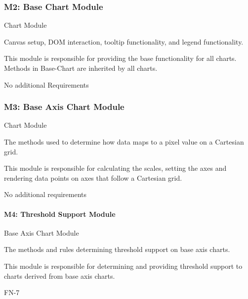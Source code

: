 \documentclass[12pt, titlepage]{article}
\begin{document}
\subsubsection{M2: Base Chart Module}
\begin{description}[style=nextline]
\item[Type:] Chart Module
\item[Secrets:] Canvas setup, DOM interaction, tooltip functionality, and legend functionality. %
\item[Responsibilities:] This module is responsible for providing the base functionality for all charts. Methods in Base-Chart are inherited by all charts.
\item[Requirements:] No additional Requirements
\end{description}


\subsubsection{M3: Base Axis Chart Module}
\begin{description}[style=nextline]
\item[Type:] Chart Module
\item[Secrets:] The methods used to determine how data maps to a pixel value on a Cartesian grid. 
\item[Responsibilities:] This module is responsible for calculating the scales, setting the axes and rendering data points on axes that follow a Cartesian grid. 
\item[Requirements:] No additional requirements
\end{description}

\paragraph{M4: Threshold Support Module}
\begin{description}[style=nextline]
\item[Type:] Base Axis Chart Module
\item[Secrets:] The methods and rules determining threshold support on base axis charts. 
\item[Responsibilities:]  This module is responsible for determining and providing threshold support to charts derived from base axis charts. 
\item[Requirements:] FN-7
\end{description}
\end{document}
